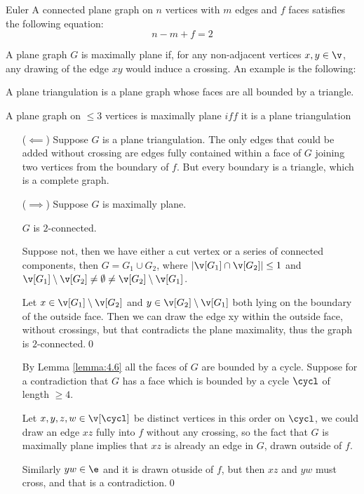 \begin{customtheorem}{Euler}
\label{theorem:euler}
    A connected plane graph on $n$ vertices with $m$ edges and $f$ faces satisfies the following equation:
    \begin{equation*}
        n  - m + f = 2
    \end{equation*}
\end{customtheorem}
A plane graph $G$ is maximally plane if, for any non-adjacent vertices $x, y \in \v$, any drawing of the edge $xy$ would induce a crossing. An example is the following:
\begin{definition}
    A plane triangulation is a plane graph whose faces are all bounded by a triangle.
\end{definition}
\begin{customlemma}{4.8}
\label{lemma:4.8}
    A plane graph on $\leq 3$ vertices is maximally plane $iff$ it is a plane triangulation
\end{customlemma}
\begin{prf}
    \begin{itemize}
        To prove the above lemma we will prove both directions
        \item [($\impliedby$)] Suppose $G$ is a plane triangulation. The only edges that could be added without crossing are edges fully contained within a face of $G$ joining two vertices from the boundary of $f$. But every boundary is a triangle, which is a complete graph.
        \item [($\implies$)] Suppose $G$ is maximally plane.
        \begin{customclaim}{1}
        \label{claim:4.8_1}
            $G$ is $2$-connected.
        \end{customclaim}
        \begin{prf}
            Suppose not, then we have either a cut vertex or a series of connected components, then $G = G_1 \cup G_2$, where $|\v[G_1] \cap \v[G_2]| \leq 1$ and $\v[G_1] \setminus \v[G_2] \neq \emptyset \neq \v[G_2] \setminus \v[G_1]$.

            Let $x \in \v[G_1] \setminus \v[G_2]$ and $y \in \v[G_2] \setminus \v[G_1]$ both lying on the boundary of the outside face. Then we can draw the edge xy within the outside face, without crossings, but that contradicts the plane maximality, thus the graph is $2$-connected.\qed
        \end{prf}
        By Lemma \ref{lemma:4.6} all the faces of $G$ are bounded by a cycle. Suppose for a contradiction that $G$ has a face which is bounded by a cycle $\cycl$ of length $\geq 4$.

        Let $x, y, z, w \in \v[\cycl]$ be distinct vertices in this order on $\cycl$, we could draw an edge $xz$ fully into $f$ without any crossing, so the fact that $G$ is maximally plane implies that $xz$ is already an edge in $G$, drawn outside of $f$.

        Similarly $yw \in \e$ and it is drawn otuside of $f$, but then $xz$ and $yw$ must cross, and that is a contradiction.\qed
    \end{itemize}
\end{prf}
